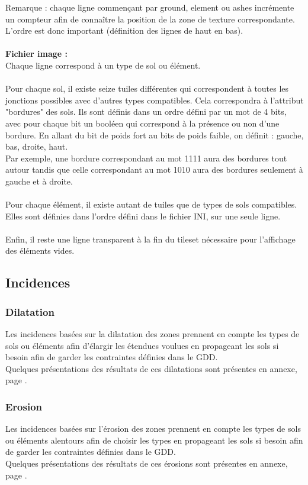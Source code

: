 \documentclass[a4paper]{memoir}
\begin{document}
				Remarque : chaque ligne commençant par ground, element ou ashes incrémente un compteur afin de connaître la position de la zone de texture correspondante. L'ordre est donc important (définition des lignes de haut en bas).\\
				\\
				\textbf{Fichier image :}\\
				Chaque ligne correspond à un type de sol ou élément.\\
				\\
				Pour chaque sol, il existe seize tuiles différentes qui correspondent à toutes les jonctions possibles avec d'autres types compatibles. Cela correspondra à l'attribut "bordures" des sols. Ils sont définis dans un ordre défini par un mot de 4 bits, avec pour chaque bit un booléen qui correspond à la présence ou non d'une bordure. En allant du bit de poids fort au bits de poids faible, on définit : gauche, bas, droite, haut.\\
				Par exemple, une bordure correspondant au mot 1111 aura des bordures tout autour tandis que celle correspondant au mot 1010 aura des bordures seulement à gauche et à droite.\\
				\\
				Pour chaque élément, il existe autant de tuiles que de types de sols compatibles. Elles sont définies dans l'ordre défini dans le fichier INI, sur une seule ligne.\\
				\\
				Enfin, il reste une ligne transparent à la fin du tileset nécessaire pour l'affichage des éléments vides.

			\subsection{Incidences}
				\label{IncidenceT}
				\subsubsection{Dilatation}
					Les incidences basées sur la dilatation des zones prennent en compte les types de sols ou éléments afin d'élargir les étendues voulues en propageant les sols si besoin afin de garder les contraintes définies dans le GDD.\\
					Quelques présentations des résultats de ces dilatations sont présentes en annexe, page \pageref{fig:dilatation}.
				
				\subsubsection{Erosion}
					Les incidences basées sur l'érosion des zones prennent en compte les types de sols ou éléments alentours afin de choisir les types en propageant les sols si besoin afin de garder les contraintes définies dans le GDD.\\
					Quelques présentations des résultats de ces érosions sont présentes en annexe, page \pageref{fig:erosion}.
				
\end{document}
